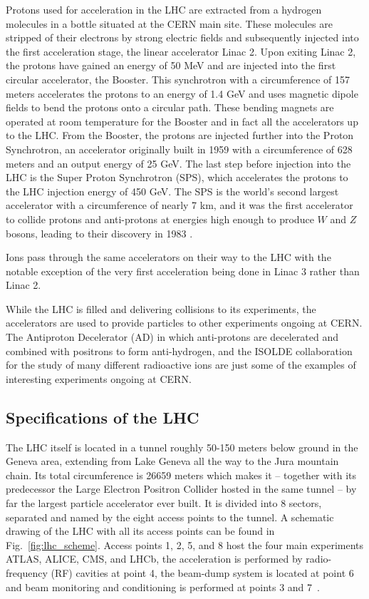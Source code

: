 Protons used for acceleration in the LHC are extracted from a hydrogen molecules in a bottle situated 
at the CERN main site. These molecules are stripped of their electrons by strong electric fields
and subsequently injected into the first acceleration stage, the linear accelerator Linac 2. Upon exiting
Linac 2, the protons have gained an energy of 50 MeV and are injected into the first circular accelerator,
the Booster. This synchrotron with a circumference of 157 meters accelerates the protons to an energy of 1.4 GeV and
uses magnetic dipole fields to bend the protons onto a circular path. These bending magnets are operated at 
room temperature for the Booster and in fact all the accelerators up to the LHC.
From the Booster, the protons are injected further into the Proton Synchrotron, an accelerator originally built
in 1959 with a circumference of 628 meters and an output energy of 25 GeV. The last step before injection into
the LHC is the Super Proton Synchrotron (SPS), which accelerates the protons to the LHC injection energy of 450 GeV.
The SPS is the world's second largest accelerator with a circumference of nearly 7 km, and it was the first accelerator
to collide protons and anti-protons at energies high enough to produce $W$ and $Z$ bosons, leading to their discovery in 1983
\cite{Wdiscovery, Zdiscovery}.

Ions pass through the same accelerators on their way to the LHC with the notable exception of the very first 
acceleration being done in Linac 3 rather than Linac 2.

While the LHC is filled and delivering collisions to its experiments, the accelerators are used to provide
particles to other experiments ongoing at CERN. The Antiproton Decelerator (AD) in which anti-protons are 
decelerated and combined with positrons to form anti-hydrogen, and the ISOLDE collaboration for the study
of many different radioactive ions are just some of the examples of interesting experiments ongoing at CERN.

\subsection{Specifications of the LHC}
\label{sub:lhc}
The LHC itself is located in a tunnel roughly 50-150 meters below ground in the Geneva
area, extending from Lake Geneva all the way to the Jura mountain chain. Its total circumference is \num{26659} meters
which makes it -- together with its predecessor the Large Electron Positron Collider hosted in the same tunnel -- by 
far the largest particle accelerator ever built. It is divided into 8 sectors, separated and named by the eight access
points to the tunnel. A schematic drawing of the LHC with all its access points can be found in Fig.~\ref{fig:lhc_scheme}.
Access points 1, 2, 5, and 8 host the four main experiments ATLAS, ALICE, CMS, and LHCb, the acceleration is performed
by radio-frequency (RF) cavities at point 4, the beam-dump system is located at point 6 and beam monitoring
and conditioning is performed at points 3 and 7~\cite{cmsdetector}.


